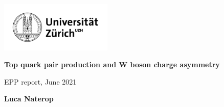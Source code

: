 \documentclass[11pt,a4paper]{article}
\begin{document}
\begin{titlepage}
	\begin{center}

		\vspace*{0cm}

		\includegraphics[width=0.4\textwidth]{fig/uzh.png}

		\vspace*{5cm}

		\Huge
		\textbf{Top quark pair production and W boson charge asymmetry}
				
		\vspace{1.5cm}
		\LARGE
		EPP report, June 2021
				
		\vspace{1.5cm}
				
		\textbf{Luca Naterop}
				
		\vfill				

		\vfill
				
		\Large

					
	\end{center}
\end{titlepage}
\end{document}
